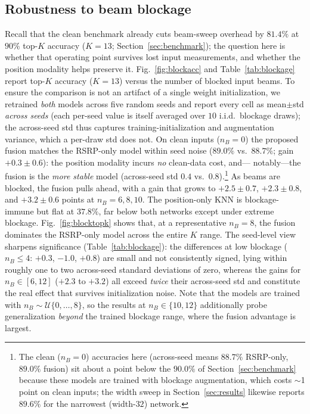\documentclass[conference]{IEEEtran}
\begin{document}
\subsection{Robustness to beam blockage}
Recall that the clean benchmark already cuts beam-sweep overhead by $81.4\%$ at
$90\%$ top-$K$ accuracy ($K{=}13$; Section~\ref{sec:benchmark}); the question here
is whether that operating point survives lost input measurements, and whether the
position modality helps preserve it.
Fig.~\ref{fig:blockacc} and Table~\ref{tab:blockage} report top-$K$ accuracy
($K=13$) versus the number of blocked input beams. To ensure the comparison is not
an artifact of a single weight initialization, we retrained \emph{both} models
across five random seeds and report every cell as mean$\pm$std \emph{across seeds}
(each per-seed value is itself averaged over $10$ i.i.d.\ blockage draws); the
across-seed std thus captures training-initialization and augmentation variance,
which a per-draw std does not. On clean inputs ($n_B=0$) the proposed fusion
matches the RSRP-only model within seed noise ($89.0\%$ vs.\ $88.7\%$; gain
$+0.3\pm0.6$): the position modality incurs \emph{no} clean-data cost, and---
notably---the fusion is the \emph{more stable} model (across-seed std $0.4$ vs.\
$0.8$).\footnote{The clean ($n_B{=}0$) accuracies here (across-seed means $88.7\%$
RSRP-only, $89.0\%$ fusion) sit about a point below the $90.0\%$ of
Section~\ref{sec:benchmark} because these models are trained with blockage
augmentation, which costs $\sim$1 point on clean inputs; the width sweep in
Section~\ref{sec:results} likewise reports $89.6\%$ for the narrowest (width-$32$)
network.} As beams are blocked, the fusion pulls ahead, with a gain that grows to
$+2.5\pm0.7$, $+2.3\pm0.8$, and $+3.2\pm0.6$ points at $n_B=6,8,10$. The
position-only KNN is blockage-immune but flat at $37.8\%$, far below both
networks except under extreme blockage. Fig.~\ref{fig:blocktopk} shows that, at a
representative $n_B=8$, the fusion dominates the RSRP-only model across the entire
$K$ range. The seed-level view sharpens significance (Table~\ref{tab:blockage}):
the differences at low blockage ($n_B\le 4$: $+0.3$, $-1.0$, $+0.8$) are small and
not consistently signed, lying within roughly one to two across-seed standard
deviations of zero, whereas the gains for $n_B\in[6,12]$ ($+2.3$ to $+3.2$) all
exceed \emph{twice} their across-seed std and constitute the real effect that
survives initialization noise. Note that the models are trained with
$n_B\sim\mathcal{U}\{0,\dots,8\}$, so the results at $n_B\in\{10,12\}$ additionally
probe generalization \emph{beyond} the trained blockage range, where the fusion
advantage is largest.
\end{document}
